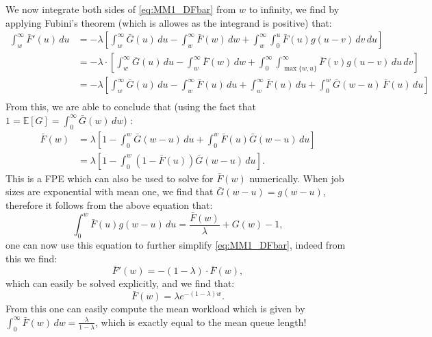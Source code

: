 \documentclass[12pt]{report}
\newcommand{\E}{\mathbb{E}}
\begin{document}
\begin{appendices}
We now integrate both sides of \eqref{eq:MM1_DFbar} from $w$ to infinity, we find by applying Fubini's theorem (which is allowes as the integrand is positive) that:
\begin{align*}
\int_w^\infty \bar F'(u) \, du
&= -\lambda \left[ \int_w^\infty \bar G(u) \, du - \int_w^\infty \bar F(w) \, dw + \int_w^\infty \int_0^u \bar F(u) g(u-v) \, dv \, du \right]\\
&= -\lambda \cdot \left[ \int_w^\infty \bar G(u) \, du - \int_w^\infty \bar F(w) \, dw + \int_0^\infty \int_{\max\{w, u\}}^\infty \bar F(v) g(u-v) \, du \, dv \right]\\
&= - \lambda \left[ \int_w^\infty \bar G(u) \, du - \int_w^\infty \bar F(u) \, du + \int_w^\infty \bar F(u) \, du + \int_0^w \bar G(w-u) \, \bar F(u) \, du \right]\\
\end{align*}
From this, we are able to conclude that (using the fact that $1 = \E[G] = \int_0^\infty \bar G(w) \, dw$) :
\begin{align*}
\bar F(w) &= \lambda \left[ 1 - \int_0^w \bar G(w-u) \, du + \int_0^w \bar F(u) \bar G(w-u) \, du \right]\\
& = \lambda \left[ 1 - \int_0^w (1-\bar F(u)) \bar G(w-u) \, du \right].
\end{align*}
This is a FPE which can also be used to solve for $\bar F(w)$ numerically. When job sizes are exponential with mean one, we find that $\bar G(w-u) = g(w-u)$, therefore it follows from the above equation that:
$$
\int_0^w \bar F(u) g(w-u) \, du = \frac{\bar F(w)}{\lambda} + G(w) - 1,
$$
one can now use this equation to further simplify \eqref{eq:MM1_DFbar}, indeed from this we find:
$$
\bar F'(w) = - (1-\lambda) \cdot \bar F(w),
$$
which can easily be solved explicitly, and we find that:
$$
\bar F(w) = \lambda e^{-(1-\lambda) w}.
$$
From this one can easily compute the mean workload which is given by $\int_0^\infty \bar F(w) \, dw = \frac{\lambda}{1-\lambda}$, which is exactly equal to the mean queue length!

\end{appendices}



\end{document}

